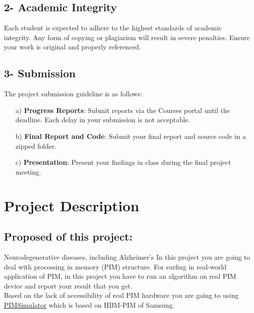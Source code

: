 \documentclass[12pt]{article}
\begin{document}
\subsection*{2- Academic Integrity}
Each student is expected to adhere to the highest standards of academic integrity. Any form of copying or plagiarism will result in severe penalties. Ensure your work is original and properly referenced.

\subsection*{3- Submission}
The project submission guideline is as follows:

\begin{enumerate}
	\item[a)] \textbf{Progress Reports}: Submit reports via the Courses portal until the deadline. Each delay in your submission is not acceptable.
	\item[b)] \textbf{Final Report and Code}: Submit your final report and source code in a zipped folder.
	\item[c)] \textbf{Presentation}: Present your findings in class during the final project meeting.
\end{enumerate}
\newpage

\tableofcontents

\newpage


\section{Project Description}

\subsection{Proposed of this project:}
Neurodegenerative diseases, including Alzheimer's In this project you are going to deal with processing in memory (PIM) structure. For surfing in real-world application of PIM, in this project you have to run an algorithm on real PIM device and report your result that you get.\\
Based on the lack of accessibility of real PIM hardware you are going to using \href{https://github.com/SAITPublic/PIMSimulator}{PIMSimulator} which is based on HBM-PIM of Samsung.
\end{document}
